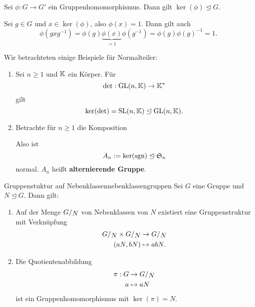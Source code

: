\begin{satz}{}{}
Sei $\phi: G \to G'$ ein Gruppenhomomorphismus. Dann gilt $\ker (\phi) \trianglelefteq G$.
\end{satz}
\begin{beweis}
Sei $g \in G$ und $x \in \ker (\phi)$, also $\phi (x) = 1$. Dann gilt auch 
\begin{equation}
\phi (gxg^{-1}) = \phi(g)\underbrace{\phi(x)}_{=1}\phi(g^{-1}) = \phi(g)\phi(g)^{-1} = 1.
\end{equation}
\end{beweis}
\begin{beispiele}
Wir betrachteten einige Beispiele für Normalteiler:
\begin{enumerate}
\item Sei $n \geq 1$ und $\mathbb{K}$ ein Körper. Für 
\begin{equation}
\det: \text{GL}(n,\mathbb{K}) \to \mathbb{K}^\ast
\end{equation}
gilt
\begin{equation}
\ker (\det) = \text{SL}(n, \mathbb{K}) \trianglelefteq \text{GL}(n,\mathbb{K}).
\end{equation}
\item Betrachte für $n \geq 1$ die Komposition
\begin{center}
\end{center}
Also ist 
\begin{equation}
A_n := \ker (\text{sgn}) \trianglelefteq \mathfrak{S}_n
\end{equation}
normal. $A_n$ heißt \textbf{alternierende Gruppe}.
\end{enumerate}
\end{beispiele}
\begin{satz}{Gruppenstuktur auf Nebenklassen}{nebenklassengruppen}
Sei $G$ eine Gruppe und $N \trianglelefteq G$. Dann gilt:
\begin{enumerate}
\item Auf der Menge $\quotient{G}{N}$ von Nebenklassen von $N$ existiert eine Gruppenstruktur mit Verknüpfung
\begin{align}
\quotient{G}{N} \times \quotient{G}{N} &\to \quotient{G}{N} \\
(aN, bN) &\mapsto abN.
\end{align}
\item Die Quotientenabbildung
\begin{align}
\pi: G &\to \quotient{G}{N}\\
a &\mapsto aN
\end{align}
ist ein Gruppenhomomorphismus mit $\ker (\pi) = N$.
\end{enumerate}
\end{satz}
